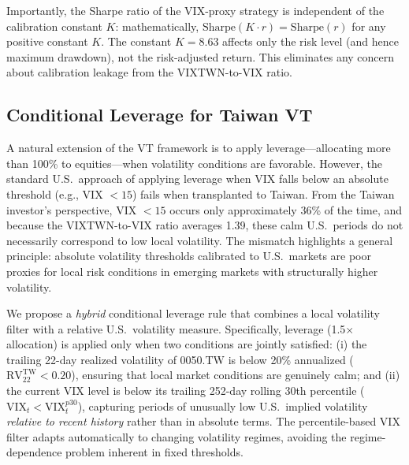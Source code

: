 Importantly, the Sharpe ratio of the VIX-proxy strategy is independent of the calibration constant $K$: mathematically, $\text{Sharpe}(K \cdot r) = \text{Sharpe}(r)$ for any positive constant $K$. The constant $K = 8.63$ affects only the risk level (and hence maximum drawdown), not the risk-adjusted return. This eliminates any concern about calibration leakage from the VIXTWN-to-VIX ratio.

\subsection{Conditional Leverage for Taiwan VT}
\label{sec:cond_leverage}

A natural extension of the VT framework is to apply leverage---allocating more than 100\% to equities---when volatility conditions are favorable. However, the standard U.S.\ approach of applying leverage when VIX falls below an absolute threshold (e.g., VIX $< 15$) fails when transplanted to Taiwan. From the Taiwan investor's perspective, VIX $< 15$ occurs only approximately 36\% of the time, and because the VIXTWN-to-VIX ratio averages 1.39, these calm U.S.\ periods do not necessarily correspond to low local volatility. The mismatch highlights a general principle: absolute volatility thresholds calibrated to U.S.\ markets are poor proxies for local risk conditions in emerging markets with structurally higher volatility.

We propose a \textit{hybrid} conditional leverage rule that combines a local volatility filter with a relative U.S.\ volatility measure. Specifically, leverage (1.5$\times$ allocation) is applied only when two conditions are jointly satisfied: (i) the trailing 22-day realized volatility of 0050.TW is below 20\% annualized ($\text{RV}_{22}^{\text{TW}} < 0.20$), ensuring that local market conditions are genuinely calm; and (ii) the current VIX level is below its trailing 252-day rolling 30th percentile ($\text{VIX}_t < \text{VIX}_{t}^{p30}$), capturing periods of unusually low U.S.\ implied volatility \textit{relative to recent history} rather than in absolute terms. The percentile-based VIX filter adapts automatically to changing volatility regimes, avoiding the regime-dependence problem inherent in fixed thresholds.

